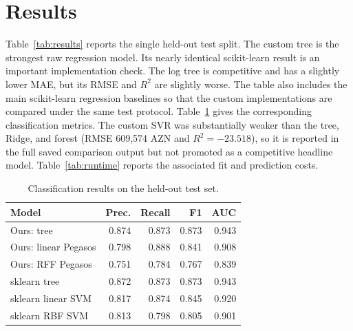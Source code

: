 \documentclass[10pt,twocolumn,a4paper]{article}
\begin{document}
\section{Results}
Table~\ref{tab:results} reports the single held-out test split. The custom
tree is the strongest raw regression model. Its nearly identical
scikit-learn result is an important implementation check. The log tree is
competitive and has a slightly lower MAE, but its RMSE and $R^2$ are
slightly worse. The table also includes the main scikit-learn regression
baselines so that the custom implementations are compared under the same
test protocol. Table~\ref{tab:classification} gives the corresponding
classification metrics. The custom SVR was substantially weaker than the
tree, Ridge, and forest (RMSE 609,574 AZN and $R^2=-23.518$), so it is
reported in the full saved comparison output but not promoted as a
competitive headline model. Table~\ref{tab:runtime} reports the associated
fit and prediction costs.

\begin{table}[t]
  \centering
  \small
  \caption{Headline results on the held-out test set.}
  \label{tab:results}
\end{table}

\begin{table}[t]
  \centering
  \small
  \caption{Classification results on the held-out test set.}
  \label{tab:classification}
  \begin{tabular}{@{}lrrrr@{}}
    \toprule
    Model & Prec. & Recall & F1 & AUC \\
    \midrule
    Ours: tree & 0.874 & 0.873 & 0.873 & 0.943 \\
    Ours: linear Pegasos & 0.798 & 0.888 & 0.841 & 0.908 \\
    Ours: RFF Pegasos & 0.751 & 0.784 & 0.767 & 0.839 \\
    sklearn tree & 0.872 & 0.873 & 0.873 & 0.943 \\
    sklearn linear SVM & 0.817 & 0.874 & 0.845 & 0.920 \\
    sklearn RBF SVM & 0.813 & 0.798 & 0.805 & 0.901 \\
    \bottomrule
  \end{tabular}
\end{table}
\end{document}
